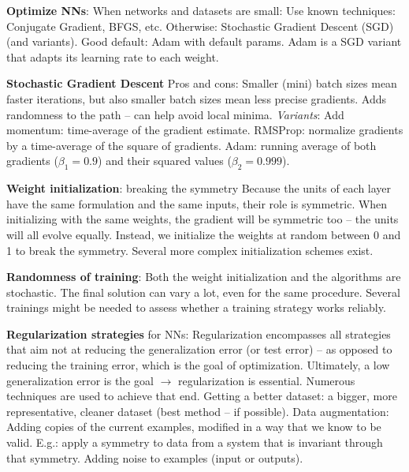 \textbf{Optimize NNs}: When networks and datasets are small:
Use known techniques: Conjugate Gradient, BFGS, etc.
Otherwise: Stochastic Gradient Descent (SGD) (and variants).
Good default: Adam with default params.
Adam is a SGD variant that adapts its learning rate to each weight.

\textbf{Stochastic Gradient Descent} Pros and cons:
Smaller (mini) batch sizes mean faster iterations, but also smaller batch sizes mean less precise gradients.
Adds randomness to the path – can help avoid local minima.
\textit{Variants}: Add momentum: time-average of the gradient estimate. RMSProp: normalize gradients by a time-average of the square of gradients. Adam: running average of both gradients ($\beta_1 = 0.9$) and their squared values ($\beta_2 = 0.999$).

\textbf{Weight initialization}: breaking the symmetry
Because the units of each layer have the same formulation and the same inputs, their role is symmetric.
When initializing with the same weights, the gradient will be symmetric too – the units will all evolve equally. Instead, we initialize the weights at random between 0 and 1 to break the symmetry.
Several more complex initialization schemes exist.

\textbf{Randomness of training}:
Both the weight initialization and the algorithms are stochastic.
The final solution can vary a lot, even for the same procedure.
Several trainings might be needed to assess whether a training strategy works reliably.

\textbf{Regularization strategies} for NNs:
Regularization encompasses all strategies that aim not at reducing the generalization error (or test error) – as opposed to reducing the training error, which is the goal of optimization.
Ultimately, a low generalization error is the goal $\rightarrow$ regularization is essential. 
Numerous techniques are used to achieve that end.
Getting a better dataset: a bigger, more representative, cleaner dataset (best method – if possible).
Data augmentation: Adding copies of the current examples, modified in a way that we know to be valid. E.g.: apply a symmetry to data from a system that is invariant through that symmetry. 
Adding noise to examples (input or outputs).

